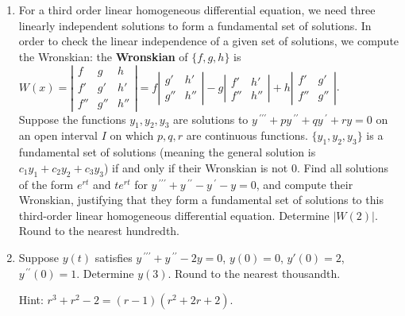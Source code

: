 \documentclass{ximera}
\begin{document}
\begin{enumerate}[label=(\arabic*)]
\item For a third order linear homogeneous differential equation, we need three linearly independent solutions to form a fundamental set of solutions. In order to check the linear independence of a given set of solutions, we compute the Wronskian:  the \textbf{Wronskian} of $\{f,g,h\}$ is\\ $\displaystyle
W(x)=\left|\begin{array}{ccc} f & g & h\\ f' & g'  & h'\\ f'' & g'' & h''\end{array}\right| = f\left|\begin{array}{cc} g' & h'\\ g'' & h'' \end{array}\right|-g\left|\begin{array}{cc} f' & h'\\ f'' & h'' \end{array}\right| + h\left|\begin{array}{cc} f' & g'\\ f'' & g'' \end{array}\right|$.\\ Suppose the functions $y_1,y_2,y_3$ are solutions to $y\,^{\prime\prime\prime}+py\,^{\prime\prime}+qy\,^{\prime}+ry=0$ on an open interval $I$ on which $p,q,r$ are continuous functions.  $\{y_1,y_2,y_3\}$ is a fundamental set of solutions (meaning the general solution is\\ $c_1 y_1+c_2 y_2+c_3 y_3$) if and only if their Wronskian is not $0$.  Find all solutions of the form $e^{rt}$ and $te^{rt}$ for $y\,^{\prime\prime\prime}+y\,^{\prime\prime}-y\,^{\prime}-y=0$, and compute their Wronskian, justifying that they form a fundamental set of solutions to this third-order linear homogeneous differential equation.  Determine $|W(2)|$.  Round to the nearest hundredth.




\item Suppose $y(t)$ satisfies $y\,^{\prime\prime\prime}+y\,^{\prime\prime}-2y=0$, $y(0)=0$, $y'(0)=2$, $y^{\,\prime\prime}(0)=1$.  Determine $y(3)$.  Round to the nearest thousandth.  


Hint: $r^3+r^2-2=(r-1)(r^2+2r+2)$.






\end{enumerate}
\end{document}
